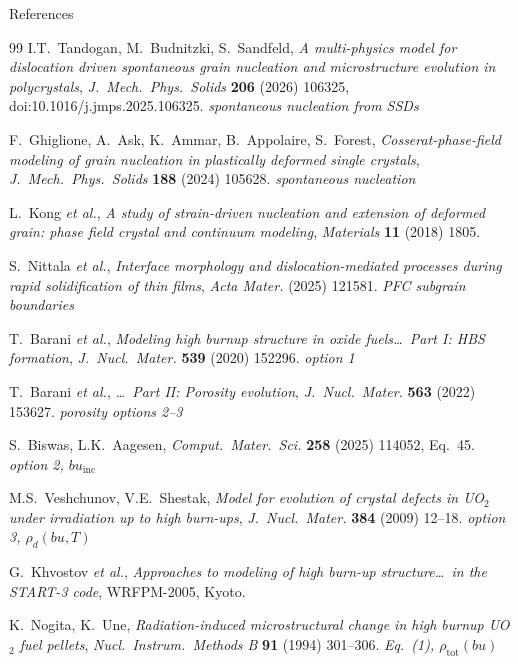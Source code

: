 \documentclass[10pt,aspectratio=169]{beamer}
\begin{document}
\begin{frame}[allowframebreaks]{References}
\begin{thebibliography}{99}
     I.T.\ Tandogan, M.\ Budnitzki, S.\ Sandfeld,
      \emph{A multi-physics model for dislocation driven spontaneous grain nucleation and
      microstructure evolution in polycrystals},
      \emph{J.\ Mech.\ Phys.\ Solids} \textbf{206} (2026) 106325,
      doi:10.1016/j.jmps.2025.106325.
      \hfill{\itshape spontaneous nucleation from SSDs}

     F.\ Ghiglione, A.\ Ask, K.\ Ammar, B.\ Appolaire, S.\ Forest,
      \emph{Cosserat-phase-field modeling of grain nucleation in plastically deformed single
      crystals}, \emph{J.\ Mech.\ Phys.\ Solids} \textbf{188} (2024) 105628.
      \hfill{\itshape spontaneous nucleation}

     L.\ Kong \emph{et al.},
      \emph{A study of strain-driven nucleation and extension of deformed grain: phase field
      crystal and continuum modeling}, \emph{Materials} \textbf{11} (2018) 1805.

     S.\ Nittala \emph{et al.},
      \emph{Interface morphology and dislocation-mediated processes during rapid solidification
      of thin films}, \emph{Acta Mater.} (2025) 121581.
      \hfill{\itshape PFC subgrain boundaries}

     T.\ Barani \emph{et al.},
      \emph{Modeling high burnup structure in oxide fuels\dots\ Part I: HBS formation},
      \emph{J.\ Nucl.\ Mater.} \textbf{539} (2020) 152296.
      \hfill{\itshape option 1}

     T.\ Barani \emph{et al.},
      \emph{\dots\ Part II: Porosity evolution},
      \emph{J.\ Nucl.\ Mater.} \textbf{563} (2022) 153627.
      \hfill{\itshape porosity options 2--3}

     S.\ Biswas, L.K.\ Aagesen,
      \emph{Comput.\ Mater.\ Sci.} \textbf{258} (2025) 114052, Eq.\ 45.
      \hfill{\itshape option 2, $bu_{\text{inc}}$}

     M.S.\ Veshchunov, V.E.\ Shestak,
      \emph{Model for evolution of crystal defects in UO$_2$ under irradiation up to high
      burn-ups}, \emph{J.\ Nucl.\ Mater.} \textbf{384} (2009) 12--18.
      \hfill{\itshape option 3, $\rho_d(bu,T)$}

     G.\ Khvostov \emph{et al.},
      \emph{Approaches to modeling of high burn-up structure\dots\ in the START-3 code},
      WRFPM-2005, Kyoto.

     K.\ Nogita, K.\ Une,
      \emph{Radiation-induced microstructural change in high burnup UO$_2$ fuel pellets},
      \emph{Nucl.\ Instrum.\ Methods B} \textbf{91} (1994) 301--306.
      \hfill{\itshape Eq.~(1), $\rho_{\text{tot}}(bu)$}


\end{thebibliography}
\end{frame}
\end{document}
